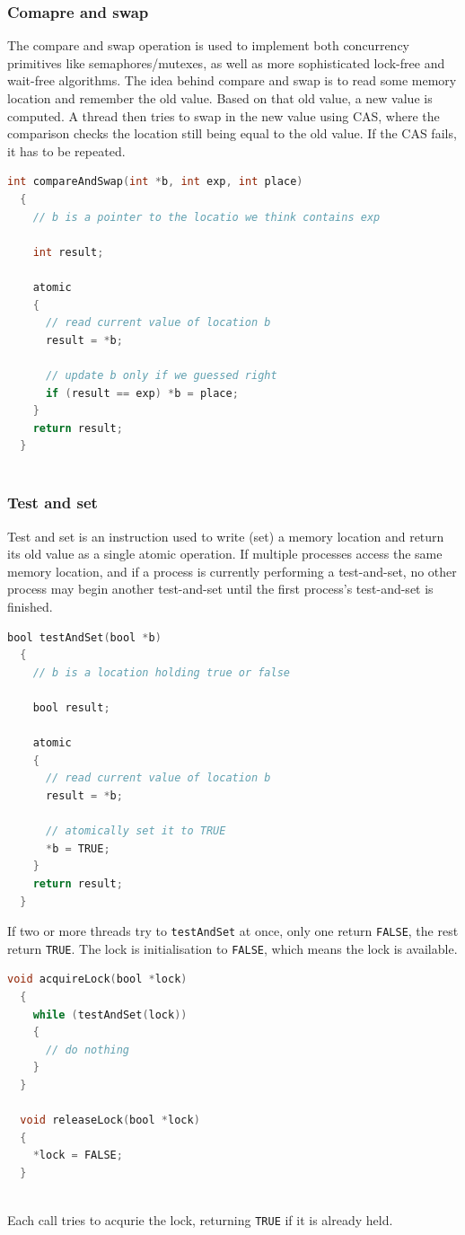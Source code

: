 \documentclass[CS4204-Notes.tex]{subfiles}
\begin{document}
\subsubsection{Comapre and swap}
The compare and swap operation is used to implement both concurrency primitives like semaphores/mutexes, as well as more sophisticated lock-free and wait-free algorithms.
\n
The idea behind compare and swap is to read some memory location and remember the old value. Based on that old value, a new value is computed. A thread then tries to swap in the new value using CAS, where the comparison checks the location still being equal to the old value. If the CAS fails, it has to be repeated.
\begin{lstlisting}[caption={Compare and swap},language=C]
  int compareAndSwap(int *b, int exp, int place)
  {
    // b is a pointer to the locatio we think contains exp
    
    int result;

    atomic
    {
      // read current value of location b
      result = *b;

      // update b only if we guessed right
      if (result == exp) *b = place;
    }
    return result;
  }
  
\end{lstlisting}

\subsubsection{Test and set}
Test and set is an instruction used to write (set) a memory location and return its old value as a single atomic operation. If multiple processes access the same memory location, and if a process is currently performing a test-and-set, no other process may begin another test-and-set until the first process's test-and-set is finished. 
\begin{lstlisting}[caption={Test and set},language=C]
  bool testAndSet(bool *b)
  {
    // b is a location holding true or false
    
    bool result;

    atomic
    {
      // read current value of location b
      result = *b;

      // atomically set it to TRUE
      *b = TRUE;
    }
    return result;
  }
\end{lstlisting}
If two or more threads try to \texttt{testAndSet} at once, only one return \texttt{FALSE}, the rest return \texttt{TRUE}. The lock is initialisation to \texttt{FALSE}, which means the lock is available.
\begin{lstlisting}[caption={Implementing a lock with test and set}, language=C]
  void acquireLock(bool *lock)
  {
    while (testAndSet(lock))
    {
      // do nothing
    }
  }

  void releaseLock(bool *lock)
  {
    *lock = FALSE;
  }
  
\end{lstlisting}
Each call tries to acqurie the lock, returning \texttt{TRUE} if it is already held.
\end{document}
